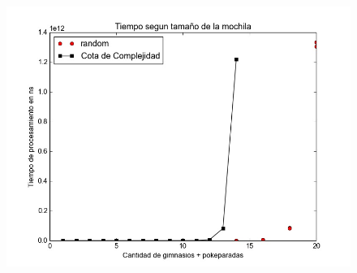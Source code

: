 
  \begin{figure}[H]
      \begin{center}
        \includegraphics[width=0.7\columnwidth]{imagenes/exp3_ej1.jpeg}
        \caption{}
      \end{center}
  \end{figure}
